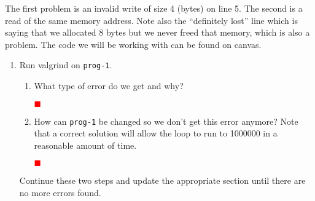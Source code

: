 \documentclass[12pt]{article}
\newcounter{problem}
\newenvironment{solution}{\par\textcolor{green!50!black}\bgroup}{\egroup\par}
\newcommand{\TODO}{\textcolor{red}{$\blacksquare$}}
\begin{document}
The first problem is an invalid write of size 4 (bytes) on line 5. The second is
a read of the same memory address. Note also the ``definitely lost'' line which
is saying that we allocated 8 bytes but we never freed that memory, which is also
a problem.  The code we will be working with can be found on canvas.

\begin{enumerate}
\item Run valgrind on \texttt{prog-1}.
\begin{enumerate}
\item What type of error do we get and why?
  \begin{solution}
  \textbf{\textcolor{red}{\TODO}}
  \end{solution}
\item How can \texttt{prog-1} be changed so we don't get this error anymore?
  Note that a correct solution will allow the loop to run to 1000000 in a
  reasonable amount of time.
  \begin{solution}
  \textbf{\textcolor{red}{\TODO}}
  \end{solution}
\end{enumerate}
Continue these two steps and update the appropriate section until there are no more errors found.


\end{enumerate}
\end{document}
